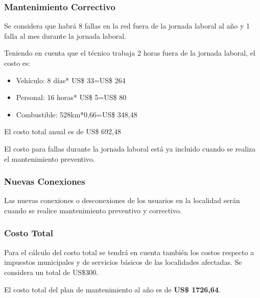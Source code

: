 \subsubsection{Mantenimiento Correctivo}

Se considera que habrá 8 fallas en la red fuera de la jornada laboral al año y 1 falla al mes durante la jornada laboral. 

Teniendo en cuenta que el técnico trabaja 2 horas fuera de la jornada laboral, el costo es:
\begin{itemize}
\item Vehículo: 8 días* US\$ 33=US\$ 264
\item Personal: 16 horas* US\$ 5=US\$ 80 
\item Combustible: 528km*0,66=US\$ 348,48
\end{itemize}

El costo total anual es de US\$ 692,48

El costo para fallas durante la jornada laboral está ya incluido cuando se realiza el mantenimiento preventivo.

\subsubsection{Nuevas Conexiones}
%
Las nuevas conexiones o desconexiones de los usuarios en la localidad serán cuando se realice mantenimiento preventivo y correctivo. 


\subsubsection{Costo Total}

Para el cálculo del costo total se tendrá en cuenta también los costos respecto a impuestos municipales y de servicios básicos de las localidades afectadas. Se considera un total de US\$300. 

El costo total del plan de mantenimiento al año es de \textbf{US\$ 1726,64}.





















